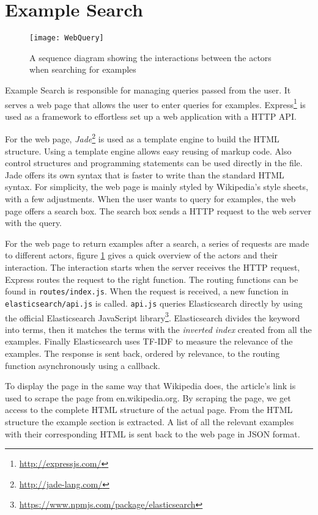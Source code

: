 \section{Example Search}

\begin{figure}[H] 
\caption{A sequence diagram showing the interactions between the actors when searching for examples}
\texttt{[image: WebQuery]}
\label{fig:web_query}
\end{figure}

Example Search is responsible for managing queries passed from the user. It serves a web page that allows the user to enter queries for examples. Express\footnote{\url{http://expressjs.com/}} is used as a framework to effortless set up a web application with a HTTP API.

For the web page, \textit{Jade}\footnote{\url{http://jade-lang.com/}} is used as a template engine to build the HTML structure. Using a template engine allows easy reusing of markup code. Also control structures and programming statements can be used directly in the file. Jade offers its own syntax that is faster to write than the standard HTML syntax. For simplicity, the web page is mainly styled by Wikipedia's style sheets, with a few adjustments. When the user wants to query for examples, the web page offers a search box. The search box sends a HTTP request to the web server with the query.

For the web page to return examples after a search, a series of requests are made to different actors, figure \ref{fig:web_query} gives a quick overview of the actors and their interaction. The interaction starts when the server receives the HTTP request, Express routes the request to the right function. The routing functions can be found in \texttt{routes/index.js}. 
When the request is received, a new function in \texttt{elasticsearch/api.js} is called. \texttt{api.js} queries Elasticsearch directly by using the official Elasticsearch JavaScript  library\footnote{\url{https://www.npmjs.com/package/elasticsearch}}. Elasticsearch divides the keyword into terms, then it matches the terms with the \textit{inverted index} created from all the examples. Finally Elasticsearch uses TF-IDF to measure the relevance of the examples. The response is sent back, ordered by relevance, to the routing function asynchronously using a callback.

To display the page in the same way that Wikipedia does, the article's link is used to scrape the page from en.wikipedia.org. By scraping the page, we get access to the complete HTML structure of the actual page. From the HTML structure the example section is extracted. A list of all the relevant examples with their corresponding HTML is sent back to the web page in JSON format. 

